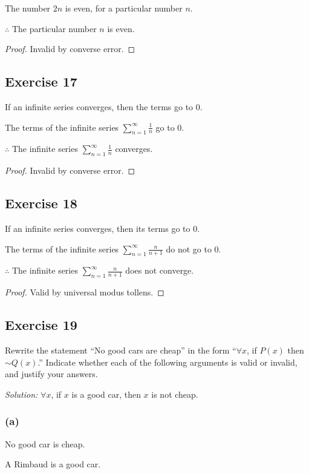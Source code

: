 \documentclass[14pt]{extarticle}
\newcommand{\dps}{\displaystyle}
\newcommand{\fa}{\forall}
\begin{document}
The number $2n$ is even, for a particular number $n$.

$\therefore$ The particular number $n$ is even.

\begin{proof}
    Invalid by converse error.
\end{proof}

\subsection{Exercise 17}
If an infinite series converges, then the terms go to 0.

The terms of the infinite series $\dps \sum_{n = 1}^{\infty} \frac{1}{n}$ go to 0.

$\therefore$ The infinite series $\dps \sum_{n = 1}^{\infty} \frac{1}{n}$ converges.

\begin{proof}
    Invalid by converse error.
\end{proof}

\subsection{Exercise 18}
If an infinite series converges, then its terms go to 0.

The terms of the infinite series $\dps \sum_{n = 1}^{\infty} \frac{n}{n+1}$ do not go to 0.

$\therefore$ The infinite series $\dps \sum_{n = 1}^{\infty} \frac{n}{n+1}$ does not converge.

\begin{proof}
    Valid by universal modus tollens.
\end{proof}

\subsection{Exercise 19}
Rewrite the statement “No good cars are cheap” in the form “$\fa x$, if $P(x)$ then $\sim Q(x)$.” Indicate whether each of the following arguments is valid or invalid, and justify your answers.

    {\it Solution:} $\fa x$, if $x$ is a good car, then $x$ is not cheap.

\subsubsection{(a)}
No good car is cheap.

A Rimbaud is a good car.
\end{document}
